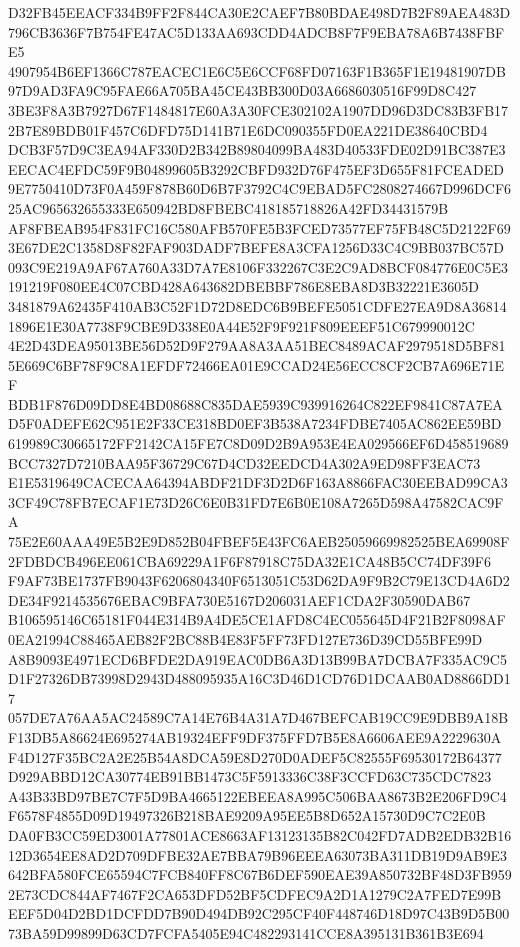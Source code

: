\documentclass[UTF8,fontset=fandol,zihao=-4,a4paper]{ctexart}
\begin{document}
{{D32FB45EEACF334B9FF2F844CA30E2CAEF7B80BDAE498D7B2F89AEA483D796CB3636F7B754FE47AC5D133AA693CDD4ADCB8F7F9EBA78A6B7438FBFE5
4907954B6EF1366C787EACEC1E6C5E6CCF68FD07163F1B365F1E19481907DB97D9AD3FA9C95FAE66A705BA45CE43BB300D03A6686030516F99D8C427
3BE3F8A3B7927D67F1484817E60A3A30FCE302102A1907DD96D3DC83B3FB172B7E89BDB01F457C6DFD75D141B71E6DC090355FD0EA221DE38640CBD4
DCB3F57D9C3EA94AF330D2B342B89804099BA483D40533FDE02D91BC387E3EECAC4EFDC59F9B04899605B3292CBFD932D76F475EF3D655F81FCEADED
9E7750410D73F0A459F878B60D6B7F3792C4C9EBAD5FC2808274667D996DCF625AC965632655333E650942BD8FBEBC418185718826A42FD34431579B
AF8FBEAB954F831FC16C580AFB570FE5B3FCED73577EF75FB48C5D2122F693E67DE2C1358D8F82FAF903DADF7BEFE8A3CFA1256D33C4C9BB037BC57D
093C9E219A9AF67A760A33D7A7E8106F332267C3E2C9AD8BCF084776E0C5E3191219F080EE4C07CBD428A643682DBEBBF786E8EBA8D3B32221E3605D
3481879A62435F410AB3C52F1D72D8EDC6B9BEFE5051CDFE27EA9D8A368141896E1E30A7738F9CBE9D338E0A44E52F9F921F809EEEF51C679990012C
4E2D43DEA95013BE56D52D9F279AA8A3AA51BEC8489ACAF2979518D5BF815E669C6BF78F9C8A1EFDF72466EA01E9CCAD24E56ECC8CF2CB7A696E71EF
BDB1F876D09DD8E4BD08688C835DAE5939C939916264C822EF9841C87A7EAD5F0ADEFE62C951E2F33CE318BD0EF3B538A7234FDBE7405AC862EE59BD
619989C30665172FF2142CA15FE7C8D09D2B9A953E4EA029566EF6D458519689BCC7327D7210BAA95F36729C67D4CD32EEDCD4A302A9ED98FF3EAC73
E1E5319649CACECAA64394ABDF21DF3D2D6F163A8866FAC30EEBAD99CA33CF49C78FB7ECAF1E73D26C6E0B31FD7E6B0E108A7265D598A47582CAC9FA
75E2E60AAA49E5B2E9D852B04FBEF5E43FC6AEB25059669982525BEA69908F2FDBDCB496EE061CBA69229A1F6F87918C75DA32E1CA48B5CC74DF39F6
F9AF73BE1737FB9043F6206804340F6513051C53D62DA9F9B2C79E13CD4A6D2DE34F9214535676EBAC9BFA730E5167D206031AEF1CDA2F30590DAB67
B106595146C65181F044E314B9A4DE5CE1AFD8C4EC055645D4F21B2F8098AF0EA21994C88465AEB82F2BC88B4E83F5FF73FD127E736D39CD55BFE99D
A8B9093E4971ECD6BFDE2DA919EAC0DB6A3D13B99BA7DCBA7F335AC9C5D1F27326DB73998D2943D488095935A16C3D46D1CD76D1DCAAB0AD8866DD17
057DE7A76AA5AC24589C7A14E76B4A31A7D467BEFCAB19CC9E9DBB9A18BF13DB5A86624E695274AB19324EFF9DF375FFD7B5E8A6606AEE9A2229630A
F4D127F35BC2A2E25B54A8DCA59E8D270D0ADEF5C82555F69530172B64377D929ABBD12CA30774EB91BB1473C5F5913336C38F3CCFD63C735CDC7823
A43B33BD97BE7C7F5D9BA4665122EBEEA8A995C506BAA8673B2E206FD9C4F6578F4855D09D19497326B218BAE9209A95EE5B8D652A15730D9C7C2E0B
DA0FB3CC59ED3001A77801ACE8663AF13123135B82C042FD7ADB2EDB32B1612D3654EE8AD2D709DFBE32AE7BBA79B96EEEA63073BA311DB19D9AB9E3
642BFA580FCE65594C7FCB840FF8C67B6DEF590EAE39A850732BF48D3FB9592E73CDC844AF7467F2CA653DFD52BF5CDFEC9A2D1A1279C2A7FED7E99B
EEF5D04D2BD1DCFDD7B90D494DB92C295CF40F448746D18D97C43B9D5B0073BA59D99899D63CD7FCFA5405E94C482293141CCE8A395131B361B3E694
}}
\end{document}
